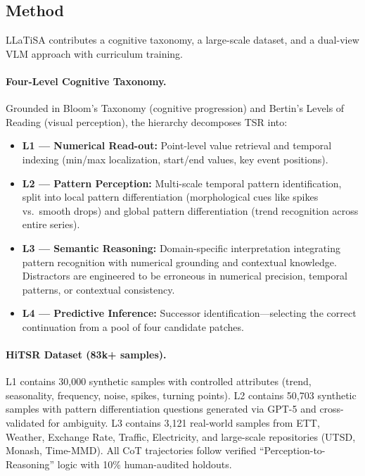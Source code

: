 \documentclass[11pt]{article}
\begin{document}
\subsection{Method}

LLaTiSA contributes a cognitive taxonomy, a large-scale dataset, and a dual-view VLM approach with curriculum training.

\paragraph{Four-Level Cognitive Taxonomy.}
Grounded in Bloom's Taxonomy (cognitive progression) and Bertin's Levels of Reading (visual perception), the hierarchy decomposes TSR into:
\begin{itemize}
    \item \textbf{L1 --- Numerical Read-out:} Point-level value retrieval and temporal indexing (min/max localization, start/end values, key event positions).
    \item \textbf{L2 --- Pattern Perception:} Multi-scale temporal pattern identification, split into local pattern differentiation (morphological cues like spikes vs.\ smooth drops) and global pattern differentiation (trend recognition across entire series).
    \item \textbf{L3 --- Semantic Reasoning:} Domain-specific interpretation integrating pattern recognition with numerical grounding and contextual knowledge. Distractors are engineered to be erroneous in numerical precision, temporal patterns, or contextual consistency.
    \item \textbf{L4 --- Predictive Inference:} Successor identification---selecting the correct continuation from a pool of four candidate patches.
\end{itemize}

\paragraph{HiTSR Dataset (83k+ samples).}
L1 contains 30,000 synthetic samples with controlled attributes (trend, seasonality, frequency, noise, spikes, turning points). L2 contains 50,703 synthetic samples with pattern differentiation questions generated via GPT-5 and cross-validated for ambiguity. L3 contains 3,121 real-world samples from ETT, Weather, Exchange Rate, Traffic, Electricity, and large-scale repositories (UTSD, Monash, Time-MMD). All CoT trajectories follow verified ``Perception-to-Reasoning'' logic with 10\% human-audited holdouts.
\end{document}
